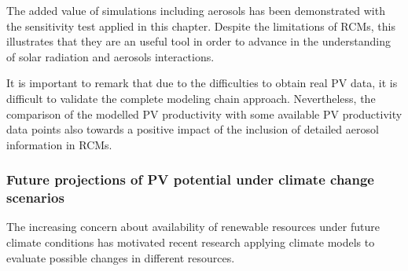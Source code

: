 The added value of simulations including aerosols has been demonstrated with the sensitivity test applied in this chapter. Despite the limitations of RCMs, this illustrates that they are an useful tool in order to advance in the understanding of solar radiation and aerosols interactions.


It is important to remark that due to the difficulties to obtain real PV data, it is difficult to validate the complete modeling chain approach. Nevertheless, the comparison of the modelled PV productivity with some available PV productivity data points also towards a positive impact of the inclusion of detailed aerosol information in RCMs.




\subsubsection{Future projections of PV potential under climate change scenarios}

The increasing concern about availability of renewable resources under future climate conditions has motivated recent research applying climate models to evaluate possible changes in different resources. 

